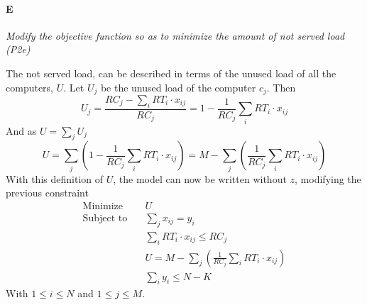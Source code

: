 \documentclass[11pt,a4paper]{article}
\begin{document}
\paragraph*{E}
{\sl Modify the objective function so as to minimize the amount of not served 
load (P2e)}

The not served load, can be described in terms of the unused load of all the 
computers, $U$. Let $U_j$ be the unused load of the computer $c_j$.  Then
%
$$ U_j = \frac{RC_j - \sum_i RT_i \cdot x_{ij}}{RC_j} =
1 - \frac{1}{RC_j} \sum_i RT_i \cdot x_{ij}$$
%
And as $U = \sum_j U_j$
%
$$U = \sum_j \left( 1 - \frac{1}{RC_j} \sum_i RT_i \cdot x_{ij} \right) =
M - \sum_j \left( \frac{1}{RC_j} \sum_i RT_i \cdot x_{ij} \right)
$$
%
With this definition of $U$, the model can now be written without $z$, modifying 
the previous constraint
%
\begin{align}
\text{Minimize}   \quad & U\\
\text{Subject to} \quad & \sum_j x_{ij} = y_i \\
& \sum_i RT_i \cdot x_{ij} \le RC_j \\
& U = M - \sum_j \left( \frac{1}{RC_j} \sum_i RT_i \cdot x_{ij} \right) \\
& \sum_i y_i \le N - K
\end{align}
With $1 \le i \le N$ and $1 \le j \le M$.
\end{document}
